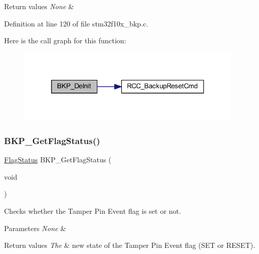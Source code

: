 \begin{DoxyRetVals}{Return values}
{\em None} & \\
\hline
\end{DoxyRetVals}


Definition at line 120 of file stm32f10x\+\_\+bkp.\+c.

Here is the call graph for this function\+:
\nopagebreak
\begin{figure}[H]
\begin{center}
\leavevmode
\includegraphics[width=304pt]{group___b_k_p___private___functions_gaabff4d8f5ebf4fd9a840bcc9042ca226_cgraph}
\end{center}
\end{figure}
\mbox{\label{group___b_k_p___private___functions_gacc9aedde760383f0bd146f0d77a547db}} 
\subsubsection{\texorpdfstring{B\+K\+P\+\_\+\+Get\+Flag\+Status()}{BKP\_GetFlagStatus()}}
{\footnotesize\ttfamily \hyperlink{group___exported__types_ga89136caac2e14c55151f527ac02daaff}{Flag\+Status} B\+K\+P\+\_\+\+Get\+Flag\+Status (\begin{DoxyParamCaption}\item[{void}]{ }\end{DoxyParamCaption})}



Checks whether the Tamper Pin Event flag is set or not. 


\begin{DoxyParams}{Parameters}
{\em None} & \\
\hline
\end{DoxyParams}

\begin{DoxyRetVals}{Return values}
{\em The} & new state of the Tamper Pin Event flag (S\+ET or R\+E\+S\+ET). \\
\hline
\end{DoxyRetVals}


